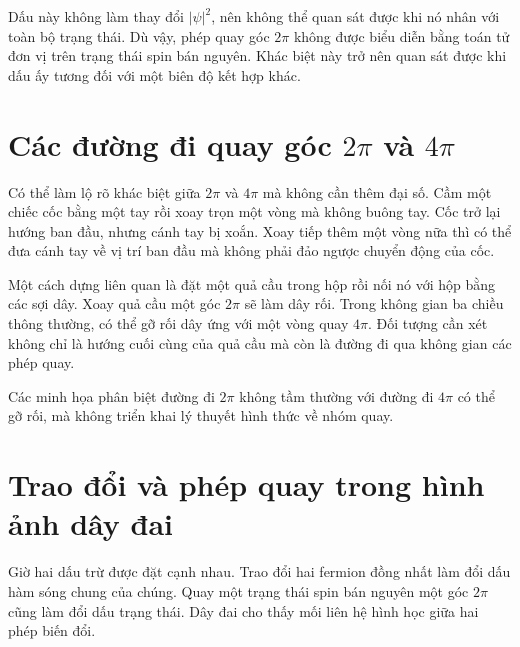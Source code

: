 Dấu này không làm thay đổi \(\lvert\psi\rvert^2\), nên không thể quan sát được khi nó nhân với toàn bộ trạng thái. Dù vậy, phép quay góc \(2\pi\) không được biểu diễn bằng toán tử đơn vị trên trạng thái spin bán nguyên. Khác biệt này trở nên quan sát được khi dấu ấy tương đối với một biên độ kết hợp khác.

\section{Các đường đi quay góc \texorpdfstring{\(2\pi\) và \(4\pi\)}{2 pi và 4 pi}}

Có thể làm lộ rõ khác biệt giữa \(2\pi\) và \(4\pi\) mà không cần thêm đại số. Cầm một chiếc cốc bằng một tay rồi xoay trọn một vòng mà không buông tay. Cốc trở lại hướng ban đầu, nhưng cánh tay bị xoắn. Xoay tiếp thêm một vòng nữa thì có thể đưa cánh tay về vị trí ban đầu mà không phải đảo ngược chuyển động của cốc.

Một cách dựng liên quan là đặt một quả cầu trong hộp rồi nối nó với hộp bằng các sợi dây. Xoay quả cầu một góc \(2\pi\) sẽ làm dây rối. Trong không gian ba chiều thông thường, có thể gỡ rối dây ứng với một vòng quay \(4\pi\). Đối tượng cần xét không chỉ là hướng cuối cùng của quả cầu mà còn là đường đi qua không gian các phép quay.

\begin{classroomqa}
\end{classroomqa}

Các minh họa phân biệt đường đi \(2\pi\) không tầm thường với đường đi \(4\pi\) có thể gỡ rối, mà không triển khai lý thuyết hình thức về nhóm quay.

\section{Trao đổi và phép quay trong hình ảnh dây đai}

Giờ hai dấu trừ được đặt cạnh nhau. Trao đổi hai fermion đồng nhất làm đổi dấu hàm sóng chung của chúng. Quay một trạng thái spin bán nguyên một góc \(2\pi\) cũng làm đổi dấu trạng thái. Dây đai cho thấy mối liên hệ hình học giữa hai phép biến đổi.

